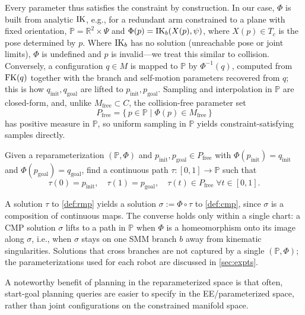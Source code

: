 \documentclass[letterpaper, 10 pt, conference]{ieeeconf}
\begin{document}
Every parameter thus satisfies the constraint by construction.
In our case, $\Phi$ is built from analytic $\operatorname{IK}$, e.g., for a redundant arm constrained to a plane with fixed orientation, $\mathbb{P} = \mathbb{R}^2 \times \Psi$ and $\Phi(p) = \operatorname{IK}_b(X(p), \psi)$, where $X(p) \in T_c$ is the pose determined by $p$.
Where $\operatorname{IK}_b$ has no solution (unreachable pose or joint limits), $\Phi$ is undefined and $p$ is invalid---we treat this similar to collision.
Conversely, a configuration $q \in M$ is mapped to $\mathbb{P}$ by $\Phi^{-1}(q)$, computed from $\operatorname{FK}(q)$ together with the branch and self-motion parameters recovered from $q$; this is how $q_\text{init}, q_\text{goal}$ are lifted to $p_\text{init}, p_\text{goal}$.
Sampling and interpolation in $\mathbb{P}$ are closed-form, and, unlike $M_\text{free} \subset C$, the collision-free parameter set
\begin{equation}\label{eqn:pfree}
  P_\text{free} = \{\, p \in \mathbb{P} \mid \Phi(p) \in M_\text{free} \,\}
\end{equation}
has positive measure in $\mathbb{P}$, so uniform sampling in $\mathbb{P}$ yields constraint-satisfying samples directly.

\begin{definition}\label{def:rmp}
Given a reparameterization $(\mathbb{P}, \Phi)$ and $p_\text{init}, p_\text{goal} \in P_\text{free}$ with $\Phi(p_\text{init}) = q_\text{init}$ and $\Phi(p_\text{goal}) = q_\text{goal}$, find a continuous path $\tau : [0,1] \to \mathbb{P}$ such that
\begin{equation*}
  \tau(0) = p_\text{init}, \quad
  \tau(1) = p_\text{goal}, \quad
  \tau(t) \in P_\text{free} \; \forall t \in [0,1].
\end{equation*}
\end{definition}

A solution $\tau$ to \cref{def:rmp} yields a solution $\sigma := \Phi \circ \tau$ to \cref{def:cmp}, since $\sigma$ is a composition of continuous maps.
The converse holds only within a single chart: a CMP solution $\sigma$ lifts to a path in $\mathbb{P}$ when $\Phi$ is a homeomorphism onto its image along $\sigma$, i.e., when $\sigma$ stays on one SMM branch $b$ away from kinematic singularities.
Solutions that cross branches are not captured by a single $(\mathbb{P}, \Phi)$; the parameterizations used for each robot are discussed in \cref{sec:expts}.

A noteworthy benefit of planning in the reparameterized space is that often, start-goal planning queries are easier to specify in the EE/parameterized space, rather than joint configurations on the constrained manifold space.
\end{document}
